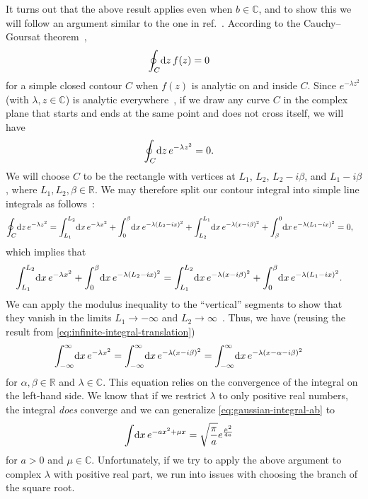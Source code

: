 It turns out that the above result applies even when $b \in \mathbb{C}$, and to show this we will follow an argument similar to the one in ref.~\cite[132-135]{kwok2002applied}.
According to the Cauchy--Goursat theorem~\cite[128]{kwok2002applied},
\begin{align}
	\oint_C\! \dif z \, f(z)
	&= 0
\end{align}
for a simple closed contour $C$ when $f(z)$ is analytic on and inside $C$.
Since $e^{-\lambda z^2}$ (with $\lambda, z \in \mathbb{C}$) is analytic everywhere~\cite[61]{kwok2002applied}, if we draw any curve $C$ in the complex plane that starts and ends at the same point and does not cross itself, we will have
\begin{align}
	\oint_C\! \dif z \, e^{-\lambda z^2}
	&= 0.
\end{align}
We will choose $C$ to be the rectangle with vertices at $L_1$, $L_2$, $L_2 - i \beta$, and $L_1 - i \beta$, where $L_1, L_2, \beta \in \mathbb{R}$.
We may therefore split our contour integral into simple line integrals as follows~\cite[122]{kwok2002applied}:
\begin{align}
	\oint_C\! \dif z \, e^{-\lambda z^2}
	&= \int_{L_1}^{L_2}\! \dif x \, e^{-\lambda x^2}
		+ \int_0^\beta\! \dif x \, e^{-\lambda (L_2 - i x)^2}
		+ \int_{L_2}^{L_1}\! \dif x \, e^{-\lambda (x - i \beta)^2}
		+ \int_\beta^0\! \dif x \, e^{-\lambda (L_1 - i x)^2}
	= 0,
\end{align}
which implies that
\begin{align}
	\int_{L_1}^{L_2}\! \dif x \, e^{-\lambda x^2}
		+ \int_0^\beta\! \dif x \, e^{-\lambda (L_2 - i x)^2}
	&= \int_{L_1}^{L_2}\! \dif x \, e^{-\lambda (x - i \beta)^2}
		+ \int_0^\beta\! \dif x \, e^{-\lambda (L_1 - i x)^2}.
\end{align}
We can apply the modulus inequality to the ``vertical'' segments to show that they vanish in the limits $L_1 \to -\infty$ and $L_2 \to \infty$~\cite[134]{kwok2002applied}.
Thus, we have (reusing the result from \cref{eq:infinite-integral-translation})
\begin{align}
	\int_{-\infty}^\infty\! \dif x \, e^{-\lambda x^2}
	&= \int_{-\infty}^\infty\! \dif x \, e^{-\lambda (x - i \beta)^2}
	= \int_{-\infty}^\infty\! \dif x \, e^{-\lambda (x - \alpha - i \beta)^2}
\end{align}
for $\alpha, \beta \in \mathbb{R}$ and $\lambda \in \mathbb{C}$.
This equation relies on the convergence of the integral on the left-hand side.
We know that if we restrict $\lambda$ to only positive real numbers, the integral \emph{does} converge and we can generalize \cref{eq:gaussian-integral-ab} to
\begin{align}
	\int\! \dif x \, e^{-a x^2 + \mu x}
	&= \sqrt{\frac{\pi}{a}} e^{\frac{\mu^2}{4 a}}
		\label{eq:gaussian-integral-amu}
\end{align}
for $a > 0$ and $\mu \in \mathbb{C}$.
Unfortunately, if we try to apply the above argument to complex $\lambda$ with positive real part, we run into issues with choosing the branch of the square root.

